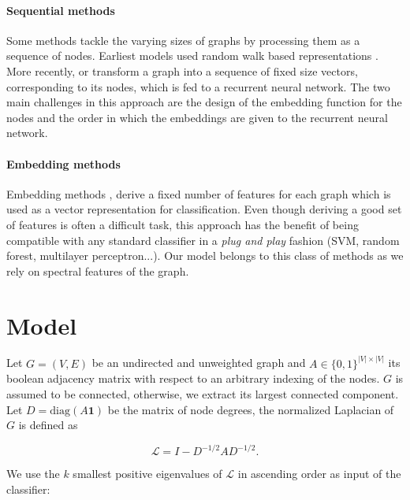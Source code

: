 \documentclass{article}
\begin{document}
\paragraph{Sequential methods}
Some methods tackle the varying sizes of graphs by processing them as a sequence of nodes. Earliest models used random walk based representations \citep{callut2008classification, xu2012protein}. More recently, \cite{jin2018learning} or \cite{you2018graphrnn} transform a graph into a sequence of fixed size vectors, corresponding to its nodes, which is fed to a recurrent neural network. The two main challenges in this approach are the design of the embedding function for the nodes and the order in which the embeddings are given to the recurrent neural network.

\paragraph{Embedding methods}
Embedding methods \citep{gomez2017dynamics, barnett2016feature, dutta2017high, DBLP:journals/corr/NarayananCVCLJ17}, derive a fixed number of features for each graph which is used as a vector representation for classification. Even though deriving a good set of features is often a difficult task, this approach has the benefit of being compatible with any standard classifier in a \textit{plug and play} fashion (SVM, random forest, multilayer perceptron...). Our model belongs to this class of methods as we rely on spectral features of the graph.

\section{Model}
\label{sec:model}




Let $G=(V, E)$ be an undirected and unweighted graph and $A \in \{0,1\}^{|V| \times |V|}$ its boolean adjacency matrix with respect to an arbitrary indexing of the nodes. $G$ is assumed to be connected, otherwise, we extract its largest connected component. Let $D = \text{diag}(A\mathbf{1})$ be the matrix of node degrees, the normalized Laplacian of $G$ is defined as

\begin{equation}
\label{eq:laplacian}
    \mathcal{L} = I - D^{-1/2}AD^{-1/2}.
\end{equation}

We use the $k$ smallest positive eigenvalues of $\mathcal{L}$ in ascending order as input of the classifier:
\end{document}
